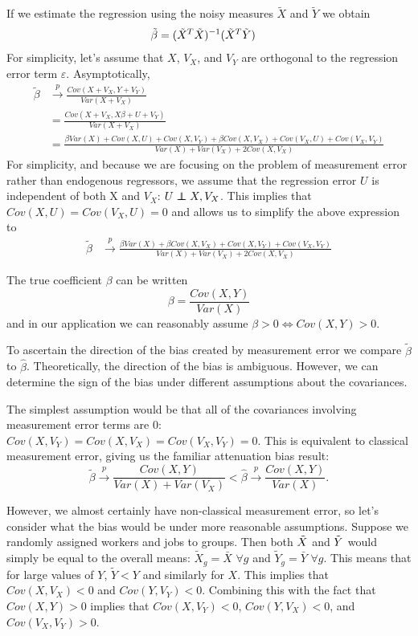 \documentclass[12pt]{article}
\theoremstyle{definition}
\theoremstyle{plain}
\newcommand\indep{\protect\mathpalette{\protect\independenT}{\perp}}
\def\independenT#1#2{\mathrel{\rlap{$#1#2$}\mkern2mu{#1#2}}}
\def\ve{\varepsilon}
\begin{document}
If we estimate the regression using the noisy measures $\tilde X$ and $\tilde Y$ we obtain
\begin{align*}
	\tilde \beta &= (\tilde X^T\tilde X)^{-1}(\tilde X^T\tilde Y) 
\end{align*}
For simplicity, let's assume that $X$, $V_X$, and $V_Y$ are orthogonal to the regression error term $\ve$. Asymptotically,
\begin{align*}
	\tilde \beta &\overset{p}{\rightarrow} \frac{Cov(X+V_X, Y+V_Y)}{Var(X+V_X)} \\
	&= \frac{Cov(X+V_X, X\beta+U + V_Y)}{Var(X+V_X)} \\
	&= \frac{\beta Var(X) + Cov(X,U) + Cov(X,V_Y) + \beta Cov(X,V_X) + Cov(V_X,U) + Cov(V_X,V_Y)}{Var(X) + Var(V_X) + 2Cov(X,V_X)}
\end{align*}
For simplicity, and because we are focusing on the problem of measurement error rather than endogenous regressors, we assume that the regression error $U$ is independent of both X and $V_X$: $U\indep X,V_X$. This implies that $Cov(X,U)=Cov(V_X,U)=0$ and allows us to simplify the above expression to
\begin{align*}
	\tilde \beta &\overset{p}{\rightarrow} \frac{\beta Var(X) + \beta Cov(X,V_X) + Cov(X,V_Y) + Cov(V_X,V_Y)}{Var(X) + Var(V_X) + 2Cov(X,V_X)}
\end{align*}

The true coefficient $\beta$ can be written
\[ \beta = \frac{Cov(X,Y)}{Var(X)}\]	
and in our application we can reasonably assume $\beta>0 \Leftrightarrow Cov(X,Y)>0$.


To ascertain the direction of the bias created by measurement error we compare $\tilde \beta$ to $\hat\beta$. Theoretically, the direction of the bias is ambiguous. However, we can determine the sign of the bias under different assumptions about the covariances. 

The simplest assumption would be that all of the covariances involving measurement error terms are 0: $Cov(X,V_Y) = Cov(X,V_X) = Cov(V_X,V_Y) = 0$. This is equivalent to classical measurement error, giving us the familiar attenuation bias result:
\[ \tilde \beta \overset{p}{\rightarrow}  \frac{Cov(X,Y)}{Var(X) + Var(V_X)} < \hat \beta \overset{p}{\rightarrow}  \frac{Cov(X,Y)}{Var(X) }.\]

However, we almost certainly have non-classical measurement error, so let's consider what the bias would be under more reasonable assumptions. Suppose we randomly assigned workers and jobs to groups. Then both $\tilde X$ and $\tilde Y$ would simply be equal to the overall means: $\tilde X_g = \bar X \hspace{4pt} \forall g$ and  $\tilde Y_g = \bar Y \hspace{4pt} \forall g$. This means that for large values of $Y$, $\tilde Y<Y$ and similarly for $X$. This implies that $Cov(X,V_X)<0$ and $Cov(Y,V_Y)<0$. Combining this with the fact that $Cov(X,Y)>0$ implies that $Cov(X,V_Y)<0$, $Cov(Y,V_X)<0$, and $Cov(V_X,V_Y)>0$. 
\end{document}
